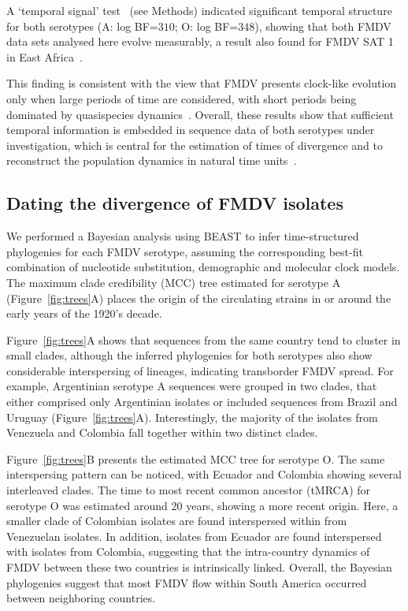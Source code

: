 \documentclass[10pt]{article}
\begin{document}
A  `temporal signal' test~\cite{Faria2012} (see Methods) indicated significant temporal structure for both serotypes (A: log BF=$310$; O: log BF=$348$), showing that both FMDV data sets analysed here evolve measurably, a result also found for FMDV SAT 1 in East Africa~\cite{sangula}.

This finding is consistent with the view that FMDV presents clock-like evolution only when large periods of time are considered, with short periods being dominated by quasispecies dynamics~\cite{Muellner2011}.
Overall, these results show that sufficient temporal information is embedded in sequence data of both serotypes under investigation, which is central for the estimation of times of divergence and to reconstruct the population dynamics in natural time units~\cite{MEP}.

\subsection*{Dating the divergence of FMDV isolates}

We performed a Bayesian analysis using BEAST to infer time-structured phylogenies for each FMDV serotype, assuming the corresponding best-fit combination of nucleotide substitution, demographic and molecular clock models.
The maximum clade credibility (MCC) tree estimated for serotype A (Figure~\ref{fig:trees}A) places the origin of the circulating strains in or around the early years of the 1920's decade.

Figure~\ref{fig:trees}A shows that sequences from the same country tend to cluster in small clades, although the inferred phylogenies for both serotypes also show considerable interspersing of lineages, indicating transborder FMDV spread.
For example, Argentinian serotype A sequences were grouped in two clades, that either comprised only Argentinian isolates or included sequences from Brazil and Uruguay (Figure~\ref{fig:trees}A).
Interestingly, the majority of the isolates from Venezuela and Colombia fall together within two distinct clades. 

Figure~\ref{fig:trees}B presents the estimated MCC tree for serotype O.
The same interspersing pattern can be noticed, with Ecuador and Colombia showing several interleaved clades.
The time to most recent common ancestor (tMRCA) for serotype O was estimated around 20 years, showing a more recent origin.
Here, a smaller clade of Colombian isolates are found interspersed within from Venezuelan isolates.
In addition, isolates from Ecuador are found interspersed with isolates from Colombia, suggesting that the intra-country dynamics of FMDV between these two countries is intrinsically linked.
Overall, the Bayesian phylogenies suggest that most FMDV flow within South America occurred between neighboring countries. 
\end{document}
